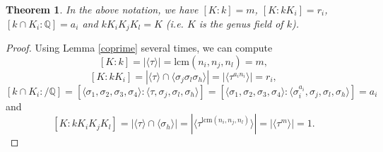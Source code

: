 \documentclass[12pt,a4paper]{article}
\newtheorem{theorem}{Theorem}
\theoremstyle{definition}
\newcommand{\Q}{\mathbb{Q}}
\newcommand{\lcm}{\mathrm{lcm}}
\begin{document}
\begin{theorem}
In the above notation, we have $[K:k]=m$, $[K:kK_i]=r_i$, $[k\cap K_i:\Q]=a_i$ and $kK_iK_jK_l=K$ (i.e. $K$ is the genus field of $k$).
\end{theorem}
\begin{proof}
Using Lemma \ref{coprime} several times, we can compute
$$[K:k]=|\langle\tau\rangle|=\lcm\left(n_i,n_j,n_l\right)=m,$$
$$[K:kK_i]=|\langle\tau\rangle\cap \langle\sigma_j\sigma_l\sigma_h\rangle|=|\langle\tau^{a_in_i}\rangle|=r_i,$$
$$[k\cap K_i:/\Q]=[\langle\sigma_1,\sigma_2,\sigma_3,\sigma_4\rangle:\langle\tau,\sigma_j,\sigma_l,\sigma_h\rangle]=[\langle\sigma_1,\sigma_2,\sigma_3,\sigma_4\rangle:\langle\sigma_i^{a_i},\sigma_j,\sigma_l,\sigma_h\rangle]=a_i$$
and
$$[K:kK_iK_jK_l]=|\langle\tau\rangle\cap \langle\sigma_h\rangle|=|\langle\tau^{\lcm\left(n_i,n_j,n_l\right)}\rangle|=|\langle\tau^m\rangle|=1.$$
\end{proof}
\end{document}

